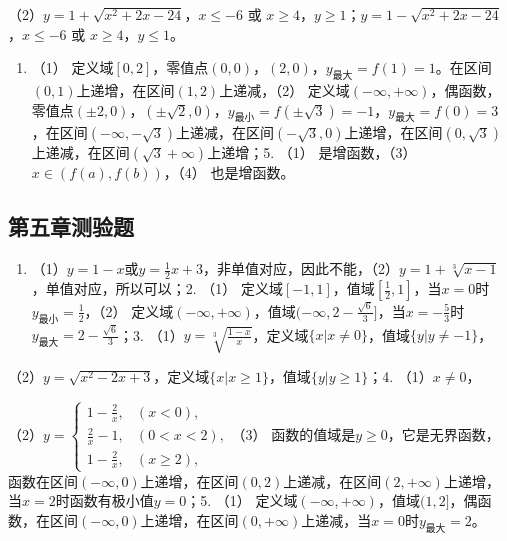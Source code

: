 （2）\(y=1+\sqrt{x^2+2x-24}\)，\(x\leqslant-6\) 或
\(x\geqslant4\)，\(y\geqslant1\)；\(y=1-\sqrt{x^2+2x-24}\)，\(x\leqslant-6\)
或 \(x\geqslant4\)，\(y\leqslant1\)。

\begin{enumerate}[start=4]
\item
  （1）
  定义域\([0, 2]\)，零值点\((0, 0)\)，\((2, 0)\)，\(y_{\text{最大}} = f(1) = 1\)。在区间\((0, 1)\)上递增，在区间\((1, 2)\)上递减，（2）
  定义域\((- \infty, + \infty)\)，偶函数，零值点\((\pm 2, 0)\)，\((\pm \sqrt{2}, 0)\)，\(y_{\text{最小}} = f(\pm \sqrt{3}) = -1\)，\(y_{\text{最大}} = f(0) = 3\)，在区间\((- \infty, -\sqrt{3})\)上递减，在区间\((- \sqrt{3}, 0)\)上递增，在区间\((0, \sqrt{3})\)上递减，在区间\((\sqrt{3} + \infty)\)上递增；5.
  （1） 是增函数，（3）\(x \in (f(a), f(b))\)，（4） 也是增函数。
\end{enumerate}

\subsection{第五章测验题}

\begin{enumerate}
\item
  （1）\(y = 1 - x\)或\(y = \frac{1}{2} x + 3\)，非单值对应，因此不能，（2）\(y = 1 + \sqrt[3]{x - 1}\)，单值对应，所以可以；2.
  （1）
  定义域\([-1, 1]\)，值域\(\left[\frac{1}{2}, 1\right]\)，当\(x = 0\)时\(y_{\text{最小}} = \frac{1}{2}\)，（2）
  定义域\((- \infty, +\infty)\)，值域\((- \infty, 2 - \frac{\sqrt{6}}{3}]\)，当\(x = -\frac{5}{3}\)时\(y_{\text{最大}} = 2 - \frac{\sqrt{6}}{3}\)；3.
  （1）\(y = \sqrt[3]{\frac{1 - x}{x}}\)，定义域\(\{x | x \neq 0\}\)，值域\(\{y | y \neq -1\}\)，
\end{enumerate}

（2）\(y = \sqrt{x^2 - 2x + 3}\)，定义域\(\{x | x \geqslant 1\}\)，值域\(\{y | y \geqslant 1\}\)；4.
（1）\(x \neq 0\)，

（2）\(y = \begin{cases} 1 - \frac{2}{x}, & (x < 0), \\ \frac{2}{x} - 1, & (0 < x < 2), \\ 1 - \frac{2}{x}, & (x \geqslant 2), \end{cases}\)（3）
函数的值域是\(y \geqslant 0\)，它是无界函数，函数在区间\((- \infty, 0)\)上递增，在区间\((0, 2)\)上递减，在区间\((2, +\infty)\)上递增，当\(x = 2\)时函数有极小值\(y = 0\)；5.
（1）
定义域\((- \infty, +\infty)\)，值域\((1, 2]\)，偶函数，在区间\((- \infty, 0)\)上递增，在区间\((0, +\infty)\)上递减，当\(x = 0\)时\(y_{\text{最大}} = 2\)。


